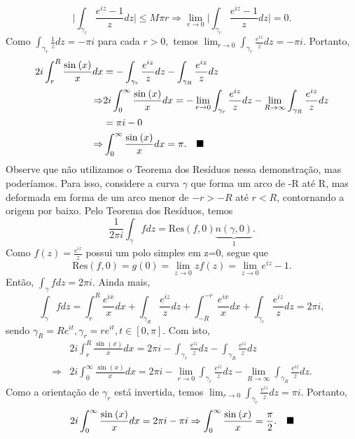 \documentclass[complex.tex]{subfiles}
\begin{document}
\begin{exer*}
	\[
		\biggl\vert \int_{\gamma_{r}}^{}\frac{e^{iz}-1}{z}dz \biggr\vert \leq M\pi r \Rightarrow \lim_{r\to 0}\biggl\vert \int_{\gamma_{r}}^{}\frac{e^{iz}-1}{z}dz \biggr\vert = 0.
	\]
	Como \(\int_{\gamma_{r}}^{}\frac{1}{z}dz = -\pi i  \) para cada \(r > 0,\) temos \(\lim_{r\to 0}\int_{\gamma_{r}}^{}\frac{e^{iz}}{z}dz = -\pi i.\)
	Portanto,
	\begin{align*}
		2i \int_{r}^{R}\frac{\sin^{}{(x)}}{x}dx & = -\int_{\gamma_{r}}^{}\frac{e^{iz}}{z}dz - \int_{\gamma_{R}}^{}\frac{e^{iz}}{z}dz                                                                          \\
		\Rightarrow                             & 2i \int_{0}^{\infty}\frac{\sin^{}{(x)}}{x}dx= -\lim_{r\to 0}\int_{\gamma_{r}}^{}\frac{e^{iz}}{z}dz - \lim_{R\to \infty}\int_{\gamma_R}^{}\frac{e^{iz}}{z}dz \\
		                                        & =\pi i - 0                                                                                                                                                  \\
		\Rightarrow                             & \int_{0}^{\infty}\frac{\sin^{}{(x)}}{x}dx = \pi .\quad \text{$\blacksquare$}
	\end{align*}
	Observe que não utilizamos o Teorema dos Resíduos nessa demonstração, mas poderíamos. Para isso, considere a curva \(\gamma \)
	que forma um arco de -R até R, mas deformada em forma de um arco menor de \(-r > -R\) até \(r < R\), contornando a origem por baixo. Pelo Teorema
	dos Resíduos, temos
	\[
		\frac{1}{2\pi i}\int_{\gamma }^{}f dz = \mathrm{Res}(f, 0)\underbrace{n(\gamma , 0)}_{1}.
	\]
	Como \(f(z) = \frac{e^{iz}}{z}\) possui um polo simples em z=0, segue que
	\[
		\mathrm{Res}(f, 0) = g(0) = \lim_{z\to 0}zf(z) = \lim_{z\to 0}e^{iz}-1.
	\]
	Então, \(\int_{\gamma }^{}f dz = 2\pi i.\) Ainda mais,
	\[
		\int_{\gamma }^{}f dz = \int_{r}^{R}\frac{e^{ix}}{x}dx + \int_{\gamma _{R}}^{}\frac{e^{iz}}{z}dz + \int_{-R}^{-r}\frac{e^{ix}}{x}dx + \int_{\gamma_{r}}^{}\frac{e^{iz}}{z}dz = 2\pi i,
	\]
	sendo \(\gamma _{R} = R e^{it}, \gamma_{r} = r e^{it}, t\in[0, \pi ].\) Com isto,
	\begin{align*}
		            & 2i \int_{r}^{R}\frac{\sin^{}{(x)}}{x}dx =2\pi i - \int_{\gamma_{r}}^{}\frac{e^{iz}}{z}dz - \int_{\gamma_{R}}^{}\frac{e^{iz}}{z}dz                                       \\
		\Rightarrow & 2i \int_{0}^{\infty}\frac{\sin^{}{(x)}}{x}dx = 2\pi i - \lim_{r\to 0}\int_{\gamma_{r}}^{}\frac{e^{iz}}{z}dz - \lim_{R\to \infty}\int_{\gamma_{R}}^{}\frac{e^{iz}}{z}dz.
	\end{align*}
	Como a orientação de \(\gamma_r \) está invertida, temos \(\lim_{r\to 0}\int_{\gamma_{r}}^{}\frac{e^{iz}}{z}dz = \pi i.\) Portanto,
	\[
		2i \int_{0}^{\infty}\frac{\sin^{}{(x)}}{x}dx = 2\pi i - \pi i \Rightarrow \int_{0}^{\infty}\frac{\sin^{}{(x)}}{x} = \frac{\pi }{2}.\quad \text{$\blacksquare$}
	\]
\end{exer*}
\end{document}
